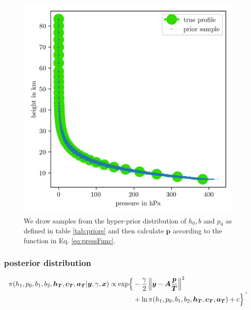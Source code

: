 \begin{figure}[ht!]
	\centering
	\includegraphics{PriorPressPostMeanSigm.png}
	\caption[Prior Samples of $\bm{p}$ according to the respective hyper-prior distribution.]{We draw samples from the hyper-prior distribution of $h_0, b$ and $p_0$ as defined in table \ref{tab:priors} and then calculate $\bm{p}$ according to the function in Eq. \ref{eq:pressFunc}.}
	\label{fig:PriorPress}
\end{figure}

\subsubsection{posterior distribution}
\begin{align}
	\begin{split}
		\pi(h_1,p_0,b_1,b_2,\bm{h_T},\bm{c_T},\bm{a_T} | \bm{y}, \gamma, \bm{x}) \propto  \exp\Bigl\{ & -\frac{\gamma}{2} \left\Vert \bm{y}- \bm{A} \frac{\bm{p}}{\bm{T}}  \right\Vert^2 \\ &+ \ln{\pi(h_1,p_0,b_1,b_2,\bm{h_T},\bm{c_T},\bm{a_T}) + c \Bigr\}  }
	\end{split} \, ,
\end{align}


\clearpage
